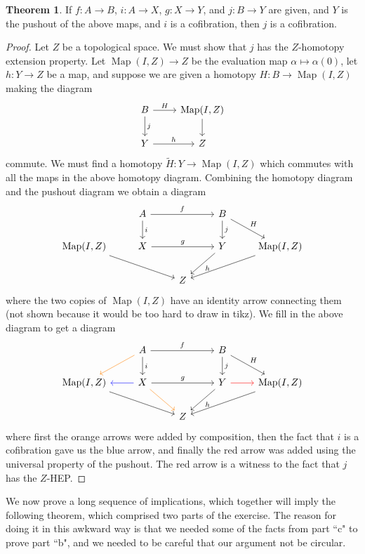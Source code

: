 \documentclass[10pt]{article}
\DeclareMathOperator{\Map}{Map}
\theoremstyle{definition}
\newtheorem{theorem}[lemma]{Theorem}
\begin{document}
\begin{theorem}
If $f: A \to B$, $i: A \to X$, $g: X \to Y$, and $j: B \to Y$ are given, and $Y$ is the pushout of the above maps, and $i$ is a cofibration, then $j$ is a cofibration.
\end{theorem}
\begin{proof}
Let $Z$ be a topological space. We must show that $j$ has the $Z$-homotopy extension property.
Let $\Map(I, Z) \to Z$ be the evaluation map $\alpha \mapsto \alpha(0)$, let $h: Y \to Z$ be a map, and suppose we are given a homotopy $H: B \to \Map(I, Z)$ making the diagram
$$\begin{tikzcd}
B \arrow[r,"H"] \arrow[d,"j"] & \Map(I, Z) \arrow[d] \\
Y \arrow[r,"h"] & Z
\end{tikzcd}$$
commute. We must find a homotopy $\tilde H: Y \to \Map(I, Z)$ which commutes with all the maps in the above homotopy diagram.
Combining the homotopy diagram and the pushout diagram we obtain a diagram
$$\begin{tikzcd}
& A \arrow[d, "i"] \arrow[rr,"f"] && B \arrow[d,"j"] \arrow[dr,"H"] \\
\Map(I, Z) \arrow[drr] & X \arrow[rr,"g"] && Y \arrow[dl,"h"] & \Map(I, Z) \arrow[dll]\\
&&Z
\end{tikzcd}$$
where the two copies of $\Map(I, Z)$ have an identity arrow connecting them (not shown because it would be too hard to draw in tikz).
We fill in the above diagram to get a diagram
$$\begin{tikzcd}
& A \arrow[d, "i"] \arrow[rr,"f"] \arrow[dl,color=orange] && B \arrow[d,"j"] \arrow[dr,"H"] \\
\Map(I, Z) \arrow[drr] & X \arrow[rr,"g"] \arrow[dr,color=orange] \arrow[l,color=blue] && Y \arrow[dl,"h"] \arrow[r,color=red] & \Map(I, Z) \arrow[dll]\\
&&Z
\end{tikzcd}$$
where first the orange arrows were added by composition, then the fact that $i$ is a cofibration gave us the blue arrow, and finally the red arrow was added using the universal property of the pushout.
The red arrow is a witness to the fact that $j$ has the $Z$-HEP.
\end{proof}

We now prove a long sequence of implications, which together will imply the following theorem, which comprised two parts of the exercise.
The reason for doing it in this awkward way is that we needed some of the facts from part ``c" to prove part ``b", and we needed to be careful that our argument not be circular.
\end{document}
